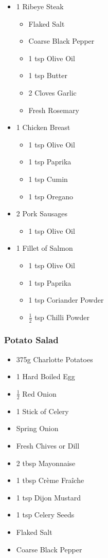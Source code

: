 \documentclass[11pt, english]{article}
\begin{document}
	\begin{itemize}
        \setlength\itemsep{0cm}
                \item 1 Ribeye Steak
		\begin{itemize}
			\item Flaked Salt
			\item Coarse Black Pepper
			\item 1 tsp Olive Oil
			\item 1 tsp Butter
			\item 2 Cloves Garlic
			\item Fresh Rosemary
		\end{itemize}
		\item 1 Chicken Breast
		\begin{itemize}
			\item 1 tsp Olive Oil
			\item 1 tsp Paprika
			\item 1 tsp Cumin
			\item 1 tsp Oregano
		\end{itemize}
		\item 2 Pork Sausages
		\begin{itemize}
			\item 1 tsp Olive Oil
		\end{itemize}
		\item 1 Fillet of Salmon
		\begin{itemize}
			\item 1 tsp Olive Oil
			\item 1 tsp Paprika
			\item 1 tsp Coriander Powder
			\item $\frac{1}{2}$ tsp Chilli Powder
		\end{itemize}
        \end{itemize}

		\subsubsection*{Potato Salad}

	\begin{itemize}
        \setlength\itemsep{0cm}
                \item 375g Charlotte Potatoes
		\item 1 Hard Boiled Egg
		\item $\frac{1}{2}$ Red Onion
		\item 1 Stick of Celery
		\item Spring Onion
		\item Fresh Chives or Dill
		\item 2 tbsp Mayonnaise
		\item 1 tbsp Cr\`{e}me Fra\^{i}che
                \item 1 tsp Dijon Mustard
                \item 1 tsp Celery Seeds
                \item Flaked Salt
                \item Coarse Black Pepper
        \end{itemize}
\end{document}
